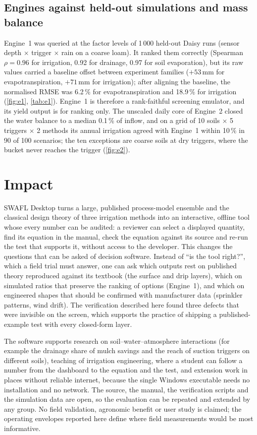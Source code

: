 \documentclass[preprint,12pt]{elsarticle}
\begin{document}
\subsection{Engines against held-out simulations and mass balance}
Engine~1 was queried at the factor levels of 1\,000 held-out Daisy runs (sensor depth $\times$ trigger $\times$ rain on a coarse loam). It ranked them correctly (Spearman $\rho=0.96$ for irrigation, 0.92 for drainage, 0.97 for soil evaporation), but its raw values carried a baseline offset between experiment families ($+53$\,mm for evapotranspiration, $+71$\,mm for irrigation); after aligning the baseline, the normalised RMSE was 6.2\,\% for evapotranspiration and 18.9\,\% for irrigation (\cref{fig:e1}, \cref{tab:e1}). Engine~1 is therefore a rank-faithful screening emulator, and its yield output is for ranking only. The unscaled daily core of Engine~2 closed the water balance to a median 0.1\,\% of inflow, and on a grid of 10 soils $\times$ 5 triggers $\times$ 2 methods its annual irrigation agreed with Engine~1 within 10\,\% in 90 of 100 scenarios; the ten exceptions are coarse soils at dry triggers, where the bucket never reaches the trigger (\cref{fig:e2}).


\section{Impact}
SWAFL Desktop turns a large, published process-model ensemble and the classical design theory of three irrigation methods into an interactive, offline tool whose every number can be audited: a reviewer can select a displayed quantity, find its equation in the manual, check the equation against its source and re-run the test that supports it, without access to the developer. This changes the questions that can be asked of decision software. Instead of ``is the tool right?'', which a field trial must answer, one can ask which outputs rest on published theory reproduced against its textbook (the surface and drip layers), which on simulated ratios that preserve the ranking of options (Engine~1), and which on engineered shapes that should be confirmed with manufacturer data (sprinkler patterns, wind drift). The verification described here found three defects that were invisible on the screen, which supports the practice of shipping a published-example test with every closed-form layer.

The software supports research on soil--water--atmosphere interactions (for example the drainage share of mulch savings and the reach of suction triggers on different soils), teaching of irrigation engineering, where a student can follow a number from the dashboard to the equation and the test, and extension work in places without reliable internet, because the single Windows executable needs no installation and no network. The source, the manual, the verification scripts and the simulation data are open, so the evaluation can be repeated and extended by any group. No field validation, agronomic benefit or user study is claimed; the operating envelopes reported here define where field measurements would be most informative.
\end{document}
